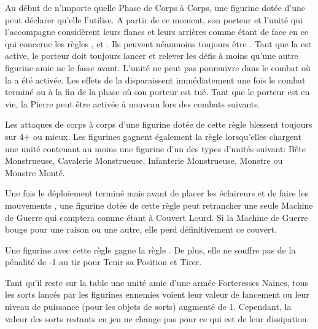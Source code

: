 \armyspecialruleentry{\holdstone}

Au début de n'importe quelle Phase de Corps à Corps, une figurine dotée d'une \holdstone peut déclarer qu'elle l'utilise. A partir de ce moment, son porteur et l'unité qui l'accompagne considèrent leurs flancs et leurs arrières comme étant de face en ce qui concerne les règles , \parry et \shieldwall. Ils peuvent néanmoins toujours être . Tant que la \holdstone est active, le porteur doit toujours lancer et relever les défis à moins qu'une autre figurine amie ne le fasse avant. L'unité ne peut pas poursuivre dans le combat où la \holdstone a été activée. Les effets de la \holdstone disparaissent immédiatement une fois le combat terminé ou à la fin de la phase où son porteur est tué. Tant que le porteur est en vie, la Pierre peut être activée à nouveau lors des combats suivants.

\armyspecialruleentry{\biggamehunters}

Les attaques de corps à corps d'une figurine dotée de cette règle blessent toujours sur 4+ ou mieux. Les figurines gagnent également la règle \swiftstride lorsqu'elles chargent une unité contenant au moins une figurine d'un des types d'unités suivant: Bête Monstrueuse, Cavalerie Monstrueuse, Infanterie Monstrueuse, Monstre ou Monstre Monté.

\armyspecialruleentry{\entrench}

Une fois le déploiement terminé mais avant de placer les éclaireurs et de faire les mouvements \vanguard, une figurine dotée de cette règle peut retrancher une seule Machine de Guerre qui comptera comme étant à Couvert Lourd. Si la Machine de Guerre bouge pour une raison ou une autre, elle perd définitivement ce couvert.

\armyspecialruleentry{\sturdy}

Une figurine avec cette règle gagne la règle \thunderouscharge. De plus, elle ne souffre pas de la pénalité de -1 au tir pour Tenir sa Position et Tirer. 

\armyspecialruleentry{\hewnoutofmountains}

Tant qu'il reste sur la table une unité amie d'une armée Forteresses Naines, tous les sorts lancés par les figurines ennemies voient leur valeur de lancement ou leur niveau de puissance (pour les objets de sorts) augmenté de 1. Cependant, la valeur des sorts restants en jeu ne change pas pour ce qui est de leur dissipation.



